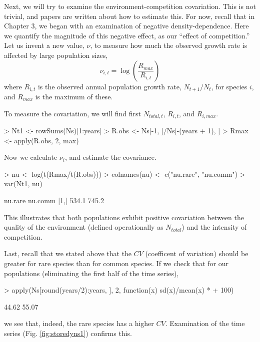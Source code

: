 Next, we will try to examine the environment-competition covariation. This is not trivial, and papers are written about how to estimate this. For now, recall that in Chapter 3, we began with an examination of negative density-dependence. Here we quantify the magnitude of this negative effect, as our ``effect of competition.'' Let us invent a new value, $\nu$, to measure how much the observed growth rate is affected by large population sizes,
\begin{equation}
  \label{eq:compnu}
  \nu_{i,t} = \log\left(\frac{R_{max}}{R_{i,t}}\right) 
\end{equation}
where $R_{i,t}$ is the observed annual population growth rate, $N_{t+1}/N_t$, for species $i$, and $R_{max}$ is the maximum of these. 

To measure the covariation, we will find first $N_{total,t}$, $R_{i,t}$, and $R_{i,max}$.
\begin{Schunk}
\begin{Sinput}
> Nt1 <- rowSums(Ns)[1:years]
> R.obs <- Ns[-1, ]/Ns[-(years + 1), ]
> Rmax <- apply(R.obs, 2, max)
\end{Sinput}
\end{Schunk}
Now we calculate $\nu_i$, and estimate the covariance.
\begin{Schunk}
\begin{Sinput}
> nu <- log(t(Rmax/t(R.obs)))
> colnames(nu) <- c("nu.rare", "nu.comm")
> var(Nt1, nu)
\end{Sinput}
\begin{Soutput}
     nu.rare nu.comm
[1,]   534.1   745.2
\end{Soutput}
\end{Schunk}
This illustrates that  both populations exhibit positive covariation between the quality of the environment (defined operationally as $N_{total}$) and the intensity of competition.

Last, recall that we stated above that the $CV$ (coefficent of variation) should be greater for rare species than for common species. If we check that for our populations (eliminating the first half of the time series),
\begin{Schunk}
\begin{Sinput}
> apply(Ns[round(years/2):years, ], 2, function(x) sd(x)/mean(x) * 
+     100)
\end{Sinput}
\begin{Soutput}
[1] 44.62 55.07
\end{Soutput}
\end{Schunk}
we see that, indeed, the rare species has a higher $CV$. Examination of the time series (Fig. \ref{fig:storedyns1}) confirms this.

